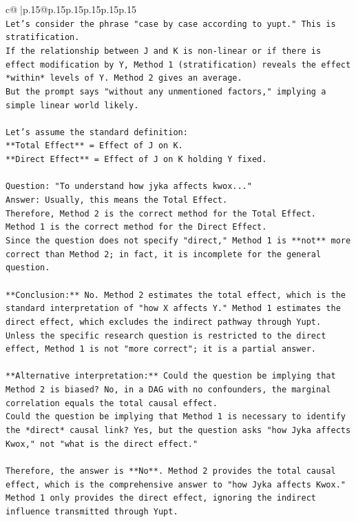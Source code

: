 \documentclass{article}
\begin{document}
{\begin{supertabular}{c@{$\;$}|p{.15\linewidth}@{}p{.15\linewidth}p{.15\linewidth}p{.15\linewidth}p{.15\linewidth}p{.15\linewidth}}
{{{\\ 
\texttt{Let's consider the phrase "case by case according to yupt." This is stratification.} \\
\texttt{If the relationship between J and K is non{-}linear or if there is effect modification by Y, Method 1 (stratification) reveals the effect *within* levels of Y. Method 2 gives an average.} \\
\texttt{But the prompt says "without any unmentioned factors," implying a simple linear world likely.} \\
\\ 
\texttt{Let's assume the standard definition:} \\
\texttt{**Total Effect** = Effect of J on K.} \\
\texttt{**Direct Effect** = Effect of J on K holding Y fixed.} \\
\\ 
\texttt{Question: "To understand how jyka affects kwox..."} \\
\texttt{Answer: Usually, this means the Total Effect.} \\
\texttt{Therefore, Method 2 is the correct method for the Total Effect.} \\
\texttt{Method 1 is the correct method for the Direct Effect.} \\
\texttt{Since the question does not specify "direct," Method 1 is **not** more correct than Method 2; in fact, it is incomplete for the general question.} \\
\\ 
\texttt{**Conclusion:** No. Method 2 estimates the total effect, which is the standard interpretation of "how X affects Y." Method 1 estimates the direct effect, which excludes the indirect pathway through Yupt. Unless the specific research question is restricted to the direct effect, Method 1 is not "more correct"; it is a partial answer.} \\
\\ 
\texttt{**Alternative interpretation:** Could the question be implying that Method 2 is biased? No, in a DAG with no confounders, the marginal correlation equals the total causal effect.} \\
\texttt{Could the question be implying that Method 1 is necessary to identify the *direct* causal link? Yes, but the question asks "how Jyka affects Kwox," not "what is the direct effect."} \\
\\ 
\texttt{Therefore, the answer is **No**. Method 2 provides the total causal effect, which is the comprehensive answer to "how Jyka affects Kwox." Method 1 only provides the direct effect, ignoring the indirect influence transmitted through Yupt.} \\
}}}
\end{supertabular}}
\end{document}
